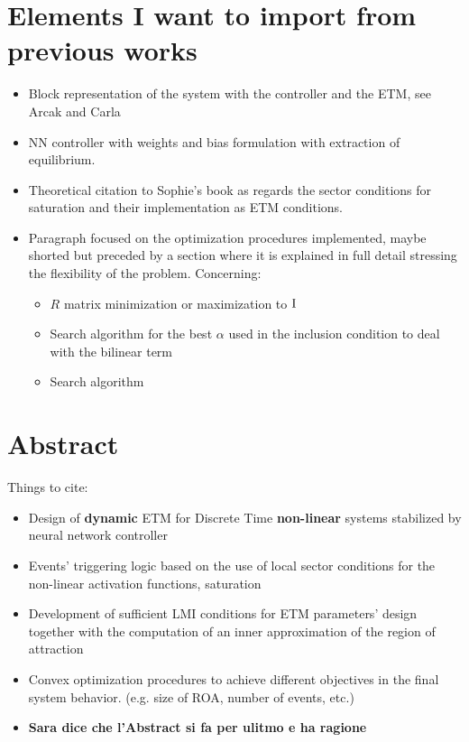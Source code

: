 \documentclass{article}
\begin{document}
\section{Elements I want to import from previous works}
\begin{itemize}
  \item Block representation of the system with the controller and the ETM, see Arcak and Carla
  \item NN controller with weights and bias formulation with extraction of equilibrium.
  \item Theoretical citation to Sophie's book as regards the sector conditions for saturation and their implementation as ETM conditions.
  \item Paragraph focused on the optimization procedures implemented, maybe shorted but preceded by a section where it is explained in full detail stressing the flexibility of the problem. Concerning: \begin{itemize}
    \item $R$ matrix minimization or maximization to $\operatorname{I}$
    \item Search algorithm for the best $\alpha$ used in the inclusion condition to deal with the bilinear term
    \item Search algorithm 
  \end{itemize} 
\end{itemize}

\section{\textbf{Abstract}}
Things to cite:
\begin{itemize}
  \item Design of \textbf{dynamic} ETM for Discrete Time \textbf{non-linear} systems stabilized by neural network controller
  \item Events' triggering logic based on the use of local sector conditions for the non-linear activation functions, saturation
  \item Development of sufficient LMI conditions for ETM parameters' design together with the computation of an inner approximation of the region of attraction
  \item Convex optimization procedures to achieve different objectives in the final system behavior. (e.g. size of ROA, number of events, etc.)
  \item \textbf{Sara dice che l'Abstract si fa per ulitmo e ha ragione}
\end{itemize}
\end{document}

